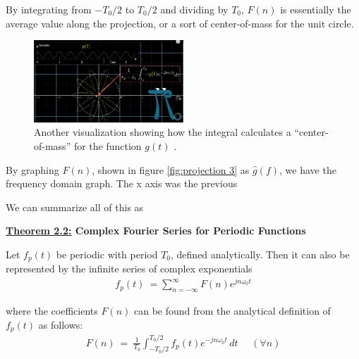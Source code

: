 \documentclass[10pt]{article}
\begin{document}
By integrating from $-T_0/2$ to $T_0/2$ and dividing by $T_0$, $F(n)$ is essentially the average value along the projection, or a sort of center-of-mass for the unit circle.

\begin{figure}[h]
    \centering
    \includegraphics[width=0.5\textwidth]{Projection_Two.jpg}
    \caption{Another visualization showing how the integral calculates a ``center-of-mass'' for the function $g(t)$ \cite{3Blue1Brown}.} 
    \label{fig:projection 2}
\end{figure}

By graphing $F(n)$, shown in figure \ref{fig:projection 3} as $\hat{g}(f)$, we have the frequency domain graph. The x axis was the previous 


\vspace{4mm}

\noindent
We can summarize all of this as 

\vspace{4mm}
\noindent
\textbf{\underline{Theorem 2.2:} Complex Fourier Series for Periodic Functions}

\vspace{1mm}
Let $f_p(t)$ be periodic with period $T_0$, defined analytically. Then it can also be represented by the infinite series of complex exponentials
\begin{equation} \label{eq:2.27}
\begin{aligned}
    f_p(t) \: = \sum_{n=-\infty}^{\infty} F(n) e^{jn\omega_0t}
\end{aligned}
\end{equation}

where the coefficients $F(n)$ can be found from the analytical definition of $f_p(t)$ as follows:
\begin{equation} \label{eq:2.28}
\begin{aligned}
    F(n) \: = \: \frac{1}{T_0}\int_{-T_0/2}^{T_0/2} f_p(t) e^{-jn\omega_0t} \,dt \:\:\:\:\:\: (\forall n)
\end{aligned}
\end{equation}
\end{document}
